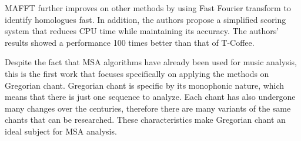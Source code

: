 MAFFT \citep{mafft} further improves on other methods by using Fast Fourier transform to identify homologues fast. In addition, the authors
propose a simplified scoring system that reduces CPU time while maintaining its accuracy. The authors' results showed a performance 
100 times better than that of T-Coffee. 

Despite the fact that MSA algorithms have already been used for music analysis, this is the first work that focuses specifically on applying
the methods on Gregorian chant. Gregorian chant is specific by its monophonic nature, which means that there is just one sequence to analyze.
Each chant has also undergone many changes over the centuries, therefore there are many variants of the same chants that can be
researched. These characteristics make Gregorian chant an ideal subject for MSA analysis.
